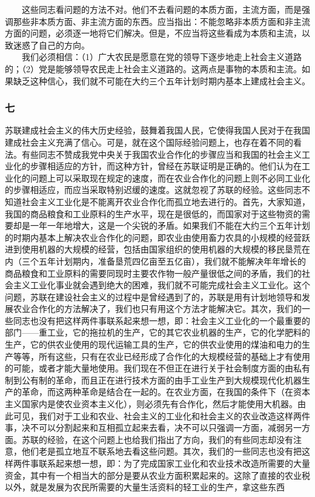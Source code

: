 \documentclass[cn,11pt,chinese]{elegantbook}
\def\myformat#1{\hfil\hfil #1}
\begin{document}
　　这些同志看问题的方法不对。他们不去看问题的本质方面，主流方面，而是强调那些非本质方面、非主流方面的东西。应当指出：不能忽略非本质方面和非主流方面的问题，必须逐一地将它们解决。但是，不应当将这些看成为本质和主流，以致迷惑了自己的方向。\\
　　我们必须相信：（1）广大农民是愿意在党的领导下逐步地走上社会主义道路的；（2）党是能够领导农民走上社会主义道路的。这两点是事物的本质和主流。如果缺乏这种信心，我们就不可能在大约三个五年计划时期内基本上建成社会主义。\\
\subsubsection*{\myformat{七}}
苏联建成社会主义的伟大历史经验，鼓舞着我国人民，它使得我国人民对于在我国建成社会主义充满了信心。可是，就在这个国际经验问题上，也存在着不同的看法。有些同志不赞成我党中央关于我国农业合作化的步骤应当和我国的社会主义工业化的步骤相适应的方针，而这种方针，曾经在苏联证明是正确的。他们认为在工业化的问题上可以采取现在规定的速度，而在农业合作化的问题上则不必同工业化的步骤相适应，而应当采取特别迟缓的速度。这就忽视了苏联的经验。这些同志不知道社会主义工业化是不能离开农业合作化而孤立地去进行的。首先，大家知道，我国的商品粮食和工业原料的生产水平，现在是很低的，而国家对于这些物资的需要却是一年一年地增大，这是一个尖锐的矛盾。如果我们不能在大约三个五年计划的时期内基本上解决农业合作化的问题，即农业由使用畜力农具的小规模的经营跃进到使用机器的大规模的经营，包括由国家组织的使用机器的大规模的移民垦荒在内（三个五年计划期内，准备垦荒四亿亩至五亿亩），我们就不能解决年年增长的商品粮食和工业原料的需要同现时主要农作物一般产量很低之间的矛盾，我们的社会主义工业化事业就会遇到绝大的困难，我们就不可能完成社会主义工业化。这个问题，苏联在建设社会主义的过程中是曾经遇到了的，苏联是用有计划地领导和发展农业合作化的方法解决了，我们也只有用这个方法才能解决它。其次，我们的一些同志也没有把这样两件事联系起来想一想，即：社会主义工业化的一个最重要的部门——重工业，它的拖拉机的生产，它的其它农业机器的生产，它的化学肥料的生产，它的供农业使用的现代运输工具的生产，它的供农业使用的煤油和电力的生产等等，所有这些，只有在农业已经形成了合作化的大规模经营的基础上才有使用的可能，或者才能大量地使用。我们现在不但正在进行关于社会制度方面的由私有制到公有制的革命，而且正在进行技术方面的由手工业生产到大规模现代化机器生产的革命，而这两种革命是结合在一起的。在农业方面，在我国的条件下（在资本主义国家内是使农业资本主义化），则必须先有合作化，然后才能使用大机器。由此可见，我们对于工业和农业、社会主义的工业化和社会主义的农业改造这样两件事，决不可以分割起来和互相孤立起来去看，决不可以只强调一方面，减弱另一方面。苏联的经验，在这个问题上也给我们指出了方向，我们的有些同志却没有注意，他们老是孤立地互不联系地去看这些问题。其次，我们的一些同志也没有把这样两件事联系起来想一想，即：为了完成国家工业化和农业技术改造所需要的大量资金，其中有一个相当大的部分是要从农业方面积累起来的。这除了直接的农业税以外，就是发展为农民所需要的大量生活资料的轻工业的生产，拿这些东西
\end{document}
